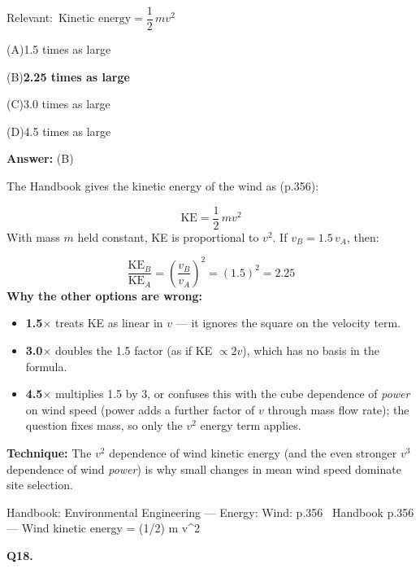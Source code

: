 \documentclass[11pt]{article}
\newcommand{\correct}[1]{\textbf{#1}\;{\color{accent}$\checkmark$}}
\newcommand{\optline}[2]{\par\noindent\hspace{1.2em}(#1)\hspace{0.6em}#2}
\begin{document}
{\small\color{soft}Relevant:}\ $\text{Kinetic energy} = \dfrac{1}{2}\,m v^2$\par\vspace{3pt}
\optline{A}{1.5 times as large}
\optline{B}{\correct{2.25 times as large}}
\optline{C}{3.0 times as large}
\optline{D}{4.5 times as large}
\par\vspace{3pt}
\vspace{2pt}\par\noindent\colorbox{boxbg}{\parbox{\dimexpr\linewidth-2\fboxsep\relax}{%
\vspace{2pt}\textbf{Answer:} (B)\par\vspace{2pt}
{\small The Handbook gives the kinetic energy of the wind as (p.356):\par
\[\text{KE} = \frac{1}{2}\,m v^2\]
With mass $m$ held constant, KE is proportional to $v^2$. If $v_B = 1.5\,v_A$, then:\par
\[\frac{\text{KE}_B}{\text{KE}_A} = \left(\frac{v_B}{v_A}\right)^2 = (1.5)^2 = 2.25\]
\textbf{Why the other options are wrong:}\par
\begin{itemize}\setlength{\itemsep}{0pt}\setlength{\parskip}{0pt}
\item \textbf{1.5$\times$} treats KE as linear in $v$ --- it ignores the square on the velocity term.
\item \textbf{3.0$\times$} doubles the 1.5 factor (as if KE $\propto 2v$), which has no basis in the formula.
\item \textbf{4.5$\times$} multiplies 1.5 by 3, or confuses this with the cube dependence of \emph{power} on wind speed (power adds a further factor of $v$ through mass flow rate); the question fixes mass, so only the $v^2$ energy term applies.
\end{itemize}
\textbf{Technique:} The $v^2$ dependence of wind kinetic energy (and the even stronger $v^3$ dependence of wind \emph{power}) is why small changes in mean wind speed dominate site selection.\par}\par\vspace{2pt}
{\footnotesize\color{soft}Handbook: Environmental Engineering --- Energy: Wind: p.356 \textbullet\ Handbook p.356 --- Wind kinetic energy = (1/2) m v\textasciicircum{}2}\vspace{2pt}
}}
\vspace{9pt}
\filbreak
\textbf{\color{accent}Q18.}\par\vspace{2pt}
\end{document}
